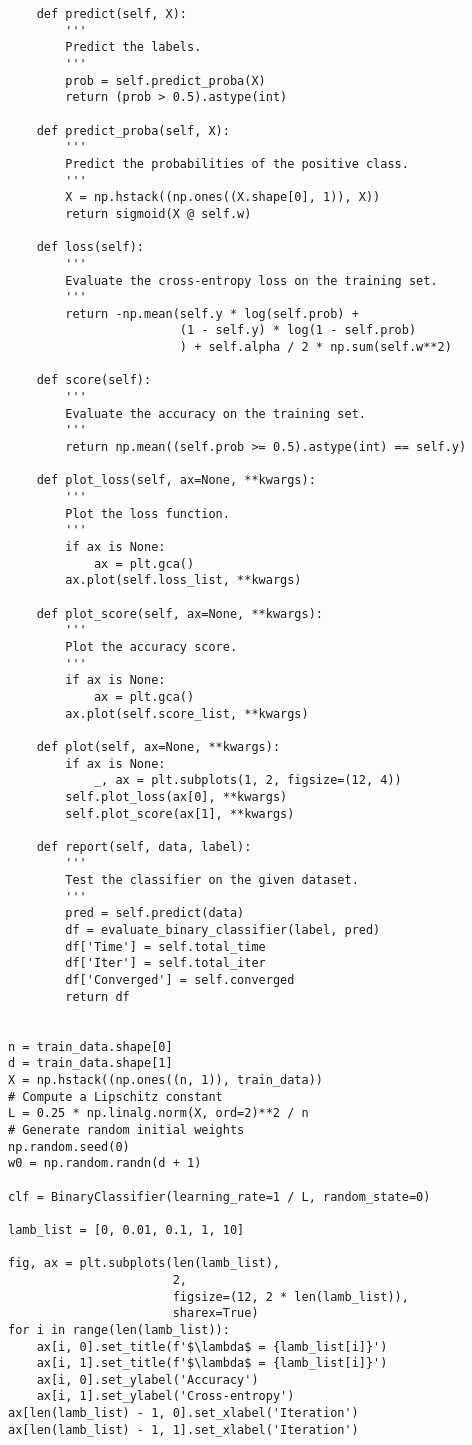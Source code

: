 \begin{verbatim}
    def predict(self, X):
        '''
        Predict the labels.
        '''
        prob = self.predict_proba(X)
        return (prob > 0.5).astype(int)

    def predict_proba(self, X):
        '''
        Predict the probabilities of the positive class.
        '''
        X = np.hstack((np.ones((X.shape[0], 1)), X))
        return sigmoid(X @ self.w)

    def loss(self):
        '''
        Evaluate the cross-entropy loss on the training set.
        '''
        return -np.mean(self.y * log(self.prob) +
                        (1 - self.y) * log(1 - self.prob)
                        ) + self.alpha / 2 * np.sum(self.w**2)

    def score(self):
        '''
        Evaluate the accuracy on the training set.
        '''
        return np.mean((self.prob >= 0.5).astype(int) == self.y)

    def plot_loss(self, ax=None, **kwargs):
        '''
        Plot the loss function.
        '''
        if ax is None:
            ax = plt.gca()
        ax.plot(self.loss_list, **kwargs)

    def plot_score(self, ax=None, **kwargs):
        '''
        Plot the accuracy score.
        '''
        if ax is None:
            ax = plt.gca()
        ax.plot(self.score_list, **kwargs)

    def plot(self, ax=None, **kwargs):
        if ax is None:
            _, ax = plt.subplots(1, 2, figsize=(12, 4))
        self.plot_loss(ax[0], **kwargs)
        self.plot_score(ax[1], **kwargs)

    def report(self, data, label):
        '''
        Test the classifier on the given dataset.
        '''
        pred = self.predict(data)
        df = evaluate_binary_classifier(label, pred)
        df['Time'] = self.total_time
        df['Iter'] = self.total_iter
        df['Converged'] = self.converged
        return df


n = train_data.shape[0]
d = train_data.shape[1]
X = np.hstack((np.ones((n, 1)), train_data))
# Compute a Lipschitz constant
L = 0.25 * np.linalg.norm(X, ord=2)**2 / n
# Generate random initial weights
np.random.seed(0)
w0 = np.random.randn(d + 1)

clf = BinaryClassifier(learning_rate=1 / L, random_state=0)
    
lamb_list = [0, 0.01, 0.1, 1, 10]

fig, ax = plt.subplots(len(lamb_list),
                       2,
                       figsize=(12, 2 * len(lamb_list)),
                       sharex=True)
for i in range(len(lamb_list)):
    ax[i, 0].set_title(f'$\lambda$ = {lamb_list[i]}')
    ax[i, 1].set_title(f'$\lambda$ = {lamb_list[i]}')
    ax[i, 0].set_ylabel('Accuracy')
    ax[i, 1].set_ylabel('Cross-entropy')
ax[len(lamb_list) - 1, 0].set_xlabel('Iteration')
ax[len(lamb_list) - 1, 1].set_xlabel('Iteration')


\end{verbatim}
